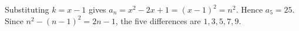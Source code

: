 Substituting $k=x-1$ gives $a_n=x^2-2x+1=(x-1)^2=n^2$. Hence $a_5=\boxed{25}$. Since $n^2-(n-1)^2=2n-1$, the five differences are $\boxed{1,3,5,7,9}$.
